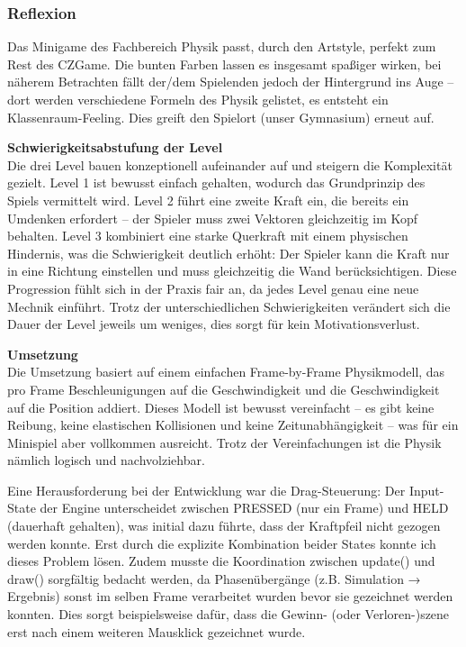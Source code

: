 \subsubsection{Reflexion}

Das Minigame des Fachbereich Physik passt, durch den Artstyle, perfekt zum Rest des CZGame. Die bunten Farben lassen es insgesamt spaßiger wirken, bei näherem Betrachten fällt der/dem Spielenden jedoch der Hintergrund ins Auge – dort werden verschiedene Formeln des Physik gelistet, es entsteht ein Klassenraum-Feeling. Dies greift den Spielort (unser Gymnasium) erneut auf.

\textbf{Schwierigkeitsabstufung der Level} \\

Die drei Level bauen konzeptionell aufeinander auf und steigern die Komplexität gezielt. Level 1 ist bewusst einfach gehalten, wodurch das Grundprinzip des Spiels vermittelt wird. Level 2 führt eine zweite Kraft ein, die bereits ein Umdenken erfordert – der Spieler muss zwei Vektoren gleichzeitig im Kopf behalten. Level 3 kombiniert eine starke Querkraft mit einem physischen Hindernis, was die Schwierigkeit deutlich erhöht: Der Spieler kann die Kraft nur in eine Richtung einstellen und muss gleichzeitig die Wand berücksichtigen. Diese Progression fühlt sich in der Praxis fair an, da jedes Level genau eine neue Mechnik einführt. Trotz der unterschiedlichen Schwierigkeiten verändert sich die Dauer der Level jeweils um weniges, dies sorgt für kein Motivationsverlust.

\textbf{Umsetzung} \\
Die Umsetzung basiert auf einem einfachen Frame-by-Frame Physikmodell, das pro Frame Beschleunigungen auf die Geschwindigkeit und die Geschwindigkeit auf die Position addiert. Dieses Modell ist bewusst vereinfacht – es gibt keine Reibung, keine elastischen Kollisionen und keine Zeitunabhängigkeit – was für ein Minispiel aber vollkommen ausreicht. Trotz der Vereinfachungen ist die Physik nämlich logisch und nachvolziehbar.

Eine Herausforderung bei der Entwicklung war die Drag-Steuerung: Der Input-State der Engine unterscheidet zwischen PRESSED (nur ein Frame) und HELD (dauerhaft gehalten), was initial dazu führte, dass der Kraftpfeil nicht gezogen werden konnte. Erst durch die explizite Kombination beider States konnte ich dieses Problem lösen. Zudem musste die Koordination zwischen update() und draw() sorgfältig bedacht werden, da Phasenübergänge (z.B. Simulation → Ergebnis) sonst im selben Frame verarbeitet wurden bevor sie gezeichnet werden konnten. Dies sorgt beispielsweise dafür, dass die Gewinn- (oder Verloren-)szene erst nach einem weiteren Mausklick gezeichnet wurde.


